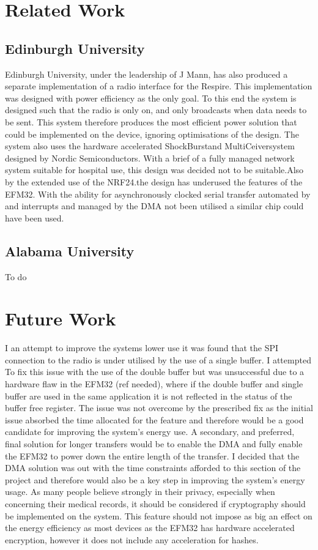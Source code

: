 \section{Related Work}

\subsection{Edinburgh University}
Edinburgh University, under the leadership of J Mann, has also produced a separate implementation
of a radio interface for the Respire. This implementation was designed with power efficiency as the
only goal. To this end the system is designed such that the radio is only on, and only broadcasts
when data needs to be sent. This system therefore produces the most efficient power solution that
could be implemented on the device, ignoring optimisations of the design. The system also uses the
hardware accelerated ShockBurst\textregistered and MultiCeiver\textregistered system designed by Nordic Semiconductors.
With a brief of a fully managed network system suitable for hospital use, this design was decided not
to be suitable.Also by the extended use of the NRF24.the design has underused the features of the
EFM32. With the ability for asynchronously clocked serial transfer automated by and interrupts and
managed by the DMA not been utilised a similar chip could have been used.

\subsection{Alabama University}
To do

\section{Future Work}
I an attempt to improve the systems lower use it was found that the SPI connection to the radio is
under utilised by the use of a single buffer. I attempted To fix this issue with the use of the double
buffer but was unsuccessful due to a hardware flaw in the EFM32 (ref needed), where if the double
buffer and single buffer are used in the same application it is not reflected in the status of the buffer
free register. The issue was not overcome by the prescribed fix as the initial issue absorbed the time
allocated for the feature and therefore would be a good candidate for improving the system's
energy use. A secondary, and preferred, final solution for longer transfers would be to enable the
DMA and fully enable the EFM32 to power down the entire length of the transfer. I decided that the
DMA solution was out with the time constraints afforded to this section of the project and therefore
would also be a key step in improving the system's energy usage.
As many people believe strongly in their privacy, especially when concerning their medical records, it
should be considered if cryptography should be implemented on the system. This feature should not
impose as big an effect on the energy efficiency as most devices as the EFM32 has hardware
accelerated encryption, however it does not include any acceleration for hashes.


